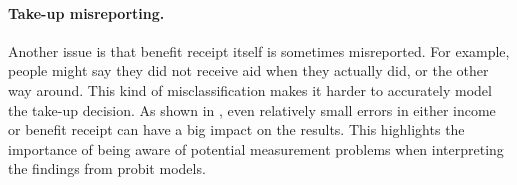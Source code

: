\paragraph{Take-up misreporting.} Another issue is that benefit receipt itself is sometimes misreported. For example, people might say they did not receive aid when they actually did, or the other way around. This kind of misclassification makes it harder to accurately model the take-up decision. As shown in \cite{pudney_impact_2001}, even relatively small errors in either income or benefit receipt can have a big impact on the results. This highlights the importance of being aware of potential measurement problems when interpreting the findings from probit models.



